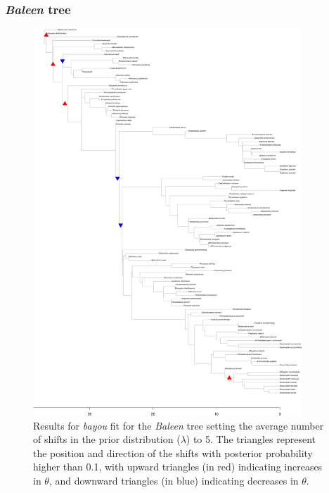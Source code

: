 \subsubsection{\textit{Baleen} tree}
\begin{figure}[H]
\includegraphics[width=0.9\textwidth]{img/plots-baleen-wZBL-k5-1.pdf}
\caption{Results for \textit{bayou} fit for the \textit{Baleen} tree setting the average number of shifts in the prior distribution ($\lambda$) to 5. The triangles represent the position and direction of the shifts with posterior probability higher than 0.1, with upward triangles (in red) indicating increases in $\theta$, and downward triangles (in blue) indicating decreases in $\theta$.}
\label{fig:baleen-k5}
\end{figure}

\newpage

